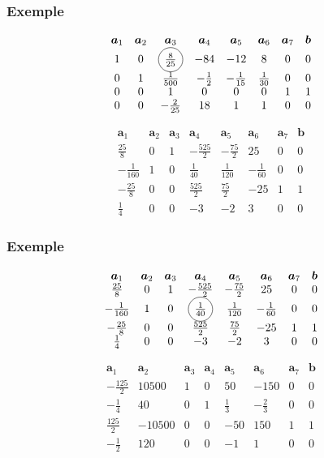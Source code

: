 \documentclass[t,usepdftitle=false]{beamer}
\newcommand*\circled[1]{\tikz[baseline=(char.base)]{
    \node[shape=circle,draw,inner sep=2pt] (char) {#1};}}
\def\ba{\boldsymbol{a}}
\def\bb{\boldsymbol{b}}
\begin{document}
\begin{frame}
	\frametitle{Exemple}
	
	\[
	\begin{matrix}
		\ba_1 & \ba_2 & \ba_3 & \ba_4 & \ba_5 &\ba_6 &\ba_7 & \bb \\
		1 & 0 & \circled{$\frac{8}{25}$} & -84 & -12 & 8 & 0 & 0 \\
		0 & 1 & \frac{1}{500} & -\frac{1}{2} & -\frac{1}{15} & \frac{1}{30} & 0 & 0 \\
		0 & 0 & 1 & 0 & 0 & 0 & 1 & 1 \\
		0 & 0 & -\frac{2}{25} & 18 & 1 & 1 & 0 & 0
	\end{matrix}
	\]
	
	\[
	\begin{matrix}
		\ba_1 & \ba_2 & \ba_3 & \ba_4 & \ba_5 &\ba_6 &\ba_7 & \bb \\
		\frac{25}{8} & 0 & 1 & -\frac{525}{2} & -\frac{75}{2} & 25 & 0 & 0 \\
		-\frac{1}{160} & 1 & 0 & \frac{1}{40} & \frac{1}{120} & -\frac{1}{60} & 0 & 0 \\
		-\frac{25}{8} & 0 & 0 & \frac{525}{2} & \frac{75}{2} & -25 & 1 & 1 \\
		\frac{1}{4} & 0 & 0 & -3 & -2 & 3 & 0 & 0
	\end{matrix}
	\]
	
\end{frame}

\begin{frame}
	\frametitle{Exemple}
	
	\[
	\begin{matrix}
		\ba_1 & \ba_2 & \ba_3 & \ba_4 & \ba_5 &\ba_6 &\ba_7 & \bb \\
		\frac{25}{8} & 0 & 1 & -\frac{525}{2} & -\frac{75}{2} & 25 & 0 & 0 \\
		-\frac{1}{160} & 1 & 0 & \circled{$\frac{1}{40}$} & \frac{1}{120} & -\frac{1}{60} & 0 & 0 \\
		-\frac{25}{8} & 0 & 0 & \frac{525}{2} & \frac{75}{2} & -25 & 1 & 1 \\
		\frac{1}{4} & 0 & 0 & -3 & -2 & 3 & 0 & 0
	\end{matrix}
	\]
	
	\[
	\begin{matrix}
		\ba_1 & \ba_2 & \ba_3 & \ba_4 & \ba_5 &\ba_6 &\ba_7 & \bb \\
		-\frac{125}{2} & 10500 & 1 & 0 & 50 & -150 & 0 & 0 \\
		-\frac{1}{4} & 40 & 0 & 1 & \frac{1}{3} & -\frac{2}{3} & 0 & 0 \\
		\frac{125}{2} & -10500 & 0 & 0 & -50 & 150 & 1 & 1 \\
		-\frac{1}{2} & 120 & 0 & 0 & -1 & 1 & 0 & 0
	\end{matrix}
	\]
	
\end{frame}
\end{document}
